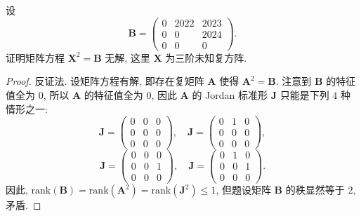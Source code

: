 \documentclass[../../main.tex]{subfiles}
\begin{document}
\begin{example}
设
\[
\boldsymbol{B} = \begin{pmatrix} 0 & 2022 & 2023 \\ 0 & 0 & 2024 \\ 0 & 0 & 0 \end{pmatrix}.
\]
证明矩阵方程 \( \boldsymbol{X}^2 = \boldsymbol{B} \) 无解, 这里 \( \boldsymbol{X} \) 为三阶未知复方阵.
\end{example}
\begin{proof}
反证法. 设矩阵方程有解, 即存在复矩阵 \( \boldsymbol{A} \) 使得 \( \boldsymbol{A}^2 = \boldsymbol{B} \). 注意到 \( \boldsymbol{B} \) 的特征值全为 \( 0 \), 所以 \( \boldsymbol{A} \) 的特征值全为 \( 0 \), 因此 \( \boldsymbol{A} \) 的 Jordan 标准形 \( \boldsymbol{J} \) 只能是下列 \( 4 \) 种情形之一:
\[
\boldsymbol{J} = \begin{pmatrix} 0 & 0 & 0 \\ 0 & 0 & 0 \\ 0 & 0 & 0 \end{pmatrix}, \quad \boldsymbol{J} = \begin{pmatrix} 0 & 1 & 0 \\ 0 & 0 & 0 \\ 0 & 0 & 0 \end{pmatrix},
\]
\[
\boldsymbol{J} = \begin{pmatrix} 0 & 0 & 0 \\ 0 & 0 & 1 \\ 0 & 0 & 0 \end{pmatrix}, \quad \boldsymbol{J} = \begin{pmatrix} 0 & 1 & 0 \\ 0 & 0 & 1 \\ 0 & 0 & 0 \end{pmatrix}.
\]
因此, \( \mathrm{rank}(\boldsymbol{B}) = \mathrm{rank}(\boldsymbol{A}^2) = \mathrm{rank}(\boldsymbol{J}^2) \leqslant 1 \), 但题设矩阵 \( \boldsymbol{B} \) 的秩显然等于 \( 2 \), 矛盾.

\end{proof}
\end{document}

